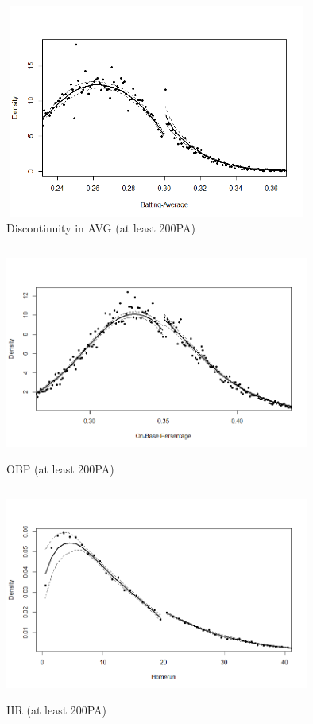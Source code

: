 \documentclass[dvipdfmx, 12pt]{article}
\begin{document}
\begin{figure}[H]
  \centering
  \includegraphics[width = 10cm, height = 7cm]{graphs/AVG_300.png}
  \caption{Discontinuity in AVG (at least 200PA)}
  \label{AVG_300}
\end{figure}
\begin{figure}[H]
  \centering
  \includegraphics[width = 10cm, height = 7cm]{graphs/OBP_350.png}
  \caption{OBP (at least 200PA)}
  \label{OBP_350}
\end{figure}
\begin{figure}
  \centering
  \includegraphics[width = 10cm, height = 7cm]{graphs/HR_20.png}
  \caption{HR (at least 200PA)}
  \label{HR_20}
\end{figure}
\end{document}
